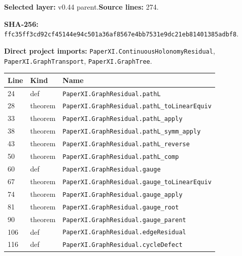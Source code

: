 \documentclass[10pt,oneside]{book}
\begin{document}
\textbf{Selected layer:} v0.44 parent.\quad\textbf{Source lines:} 274.\par\textbf{SHA-256:} {\scriptsize\nolinkurl{ffc35ff3cd92cf45144e94c501a36af8567e4bb7531e9dc21eb81401385adbf8}}.


\textbf{Direct project imports:} \nolinkurl{PaperXI.ContinuousHolonomyResidual}, \nolinkurl{PaperXI.GraphTransport}, \nolinkurl{PaperXI.GraphTree}.

\begin{longtable}{@{}p{}p{}p{}@{}}\toprule Line&Kind&Name\\\midrule\endhead

24&def&\nolinkurl{PaperXI.GraphResidual.pathL}\\

28&theorem&\nolinkurl{PaperXI.GraphResidual.pathL_toLinearEquiv}\\

33&theorem&\nolinkurl{PaperXI.GraphResidual.pathL_apply}\\

38&theorem&\nolinkurl{PaperXI.GraphResidual.pathL_symm_apply}\\

43&theorem&\nolinkurl{PaperXI.GraphResidual.pathL_reverse}\\

50&theorem&\nolinkurl{PaperXI.GraphResidual.pathL_comp}\\

60&def&\nolinkurl{PaperXI.GraphResidual.gauge}\\

67&theorem&\nolinkurl{PaperXI.GraphResidual.gauge_toLinearEquiv}\\

74&theorem&\nolinkurl{PaperXI.GraphResidual.gauge_apply}\\

81&theorem&\nolinkurl{PaperXI.GraphResidual.gauge_root}\\

90&theorem&\nolinkurl{PaperXI.GraphResidual.gauge_parent}\\

106&def&\nolinkurl{PaperXI.GraphResidual.edgeResidual}\\

116&def&\nolinkurl{PaperXI.GraphResidual.cycleDefect}\\


\end{longtable}
\end{document}
